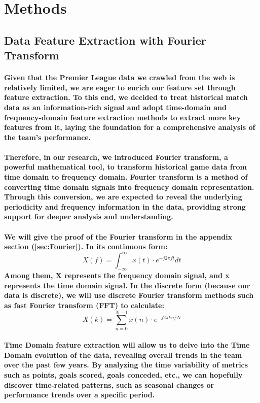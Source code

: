 \section{Methods}
% 
% 
\subsection{Data Feature Extraction with Fourier Transform}
% 
% 
% 
% 
% 
% 
% 
% 
\paragraph{Given that the Premier League data we crawled from the web is relatively limited, we are eager to enrich our feature set through feature extraction. To this end, we decided to treat historical match data as an information-rich signal and adopt time-domain and frequency-domain feature extraction methods to extract more key features from it, laying the foundation for a comprehensive analysis of the team's performance.}
% 
\paragraph{Therefore, in our research, we introduced Fourier transform, a powerful mathematical tool, to transform historical game data from time domain to frequency domain. Fourier transform is a method of converting time domain signals into frequency domain representation. Through this conversion, we are expected to reveal the underlying periodicity and frequency information in the data, providing strong support for deeper analysis and understanding.}
% 
% 
\paragraph{We will give the proof of the Fourier transform in the appendix section (\ref{sec:Fourier}). In its continuous form: $$ X(f) = \int_{-\infty}^{\infty} x(t) \cdot e^{-j2\pi ft} dt $$ Among them, X represents the frequency domain signal, and x represents the time domain signal. In the discrete form (because our data is discrete), we will use discrete Fourier transform methods such as fast Fourier transform (FFT) to calculate: $$ X(k) = \sum_{n=0}^{N-1} x(n) \cdot e^{-j2\pi kn/N} $$}
% 
% 
\paragraph{Time Domain feature extraction will allow us to delve into the Time Domain evolution of the data, revealing overall trends in the team over the past few years. By analyzing the time variability of metrics such as points, goals scored, goals conceded, etc., we can hopefully discover time-related patterns, such as seasonal changes or performance trends over a specific period.}
% 
